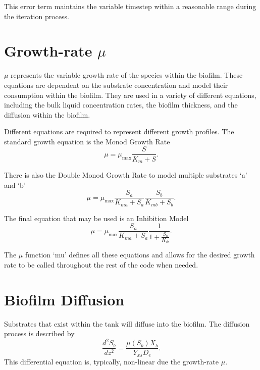 \documentclass[letterpaper, twoside]{article}
\numberwithin{equation}{section}
\begin{document}
This error term maintains the variable timestep within a reasonable range during the iteration process.

\section{Growth-rate $\mu$}\label{sec:mu}
$\mu$ represents the variable growth rate of the species within the biofilm. These equations are dependent on the substrate concentration and model their consumption within the biofilm. They are used in a variety of different equations, including the bulk liquid concentration rates, the biofilm thickness, and the diffusion within the biofilm.

Different equations are required to represent different growth profiles. The standard growth equation is the Monod Growth Rate
\begin{equation} \label{eq: MonodGrowthRate}
  \mu=\mu_\mathrm{max} \frac{S}{K_m + S}.
\end{equation}

There is also the Double Monod Growth Rate to model multiple substrates `a' and `b'
\begin{equation} \label{eq: DoubleMonodGrowthRate}
  \mu=\mu_\mathrm{max} \frac{S_a}{K_{ma} + S_a} \frac{S_b}{K_{mb} + S_b}.
\end{equation}

The final equation that may be used is an Inhibition Model
\begin{equation} \label{eq: Inhibition}
  \mu=\mu_\mathrm{max} \frac{S_a}{K_{ma} + S_a} \frac{1}{1 + \frac{S_b}{K_{ib}}}.
\end{equation}

The $\mu$ function `mu' defines all these equations and allows for the desired growth rate to be called throughout the rest of the code when needed.
  

\section{Biofilm Diffusion}
Substrates that exist within the tank will diffuse into the biofilm.  The diffusion process is described by
\begin{equation} \label{eq:diffusion}
  \frac{d^2 S_b}{dz^2} = \frac{\mu(S_b) X_b}{Y_{xs} D_e}.
\end{equation}
This differential equation is, typically, non-linear due the growth-rate $\mu$.
\end{document}
